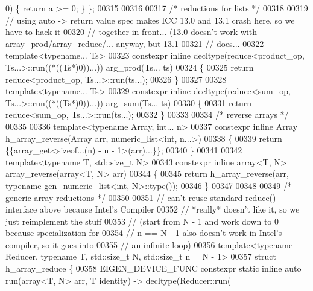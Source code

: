 \begin{DoxyCode}
      0)  \{ \textcolor{keywordflow}{return} a >= 0;  \} \};
00315 
00316 
00317 \textcolor{comment}{/* reductions for lists */}
00318 
00319 \textcolor{comment}{// using auto -> return value spec makes ICC 13.0 and 13.1 crash here, so we have to hack it}
00320 \textcolor{comment}{// together in front... (13.0 doesn't work with array\_prod/array\_reduce/... anyway, but 13.1}
00321 \textcolor{comment}{// does...}
00322 \textcolor{keyword}{template}<\textcolor{keyword}{typename}... Ts>
00323 constexpr \textcolor{keyword}{inline} decltype(reduce<product\_op, Ts...>::run((*((Ts*)0))...)) arg\_prod(Ts... ts)
00324 \{
00325   \textcolor{keywordflow}{return} reduce<product\_op, Ts...>::run(ts...);
00326 \}
00327 
00328 \textcolor{keyword}{template}<\textcolor{keyword}{typename}... Ts>
00329 constexpr \textcolor{keyword}{inline} decltype(reduce<sum\_op, Ts...>::run((*((Ts*)0))...)) arg\_sum(Ts... ts)
00330 \{
00331   \textcolor{keywordflow}{return} reduce<sum\_op, Ts...>::run(ts...);
00332 \}
00333 
00334 \textcolor{comment}{/* reverse arrays */}
00335 
00336 \textcolor{keyword}{template}<\textcolor{keyword}{typename} Array, \textcolor{keywordtype}{int}... n>
00337 constexpr \textcolor{keyword}{inline} Array h\_array\_reverse(Array arr, numeric\_list<int, n...>)
00338 \{
00339   \textcolor{keywordflow}{return} \{\{array\_get<\textcolor{keyword}{sizeof}...(n) - n - 1>(arr)...\}\};
00340 \}
00341 
00342 \textcolor{keyword}{template}<\textcolor{keyword}{typename} T, std::\textcolor{keywordtype}{size\_t} N>
00343 constexpr \textcolor{keyword}{inline} array<T, N> array\_reverse(array<T, N> arr)
00344 \{
00345   \textcolor{keywordflow}{return} h\_array\_reverse(arr, \textcolor{keyword}{typename} gen\_numeric\_list<int, N>::type());
00346 \}
00347 
00348 
00349 \textcolor{comment}{/* generic array reductions */}
00350 
00351 \textcolor{comment}{// can't reuse standard reduce() interface above because Intel's Compiler}
00352 \textcolor{comment}{// *really* doesn't like it, so we just reimplement the stuff}
00353 \textcolor{comment}{// (start from N - 1 and work down to 0 because specialization for}
00354 \textcolor{comment}{// n == N - 1 also doesn't work in Intel's compiler, so it goes into}
00355 \textcolor{comment}{// an infinite loop)}
00356 \textcolor{keyword}{template}<\textcolor{keyword}{typename} Reducer, \textcolor{keyword}{typename} T, std::size\_t N, std::size\_t n = N - 1>
00357 \textcolor{keyword}{struct }h\_array\_reduce \{
00358   EIGEN\_DEVICE\_FUNC constexpr \textcolor{keyword}{static} \textcolor{keyword}{inline} \textcolor{keyword}{auto} run(array<T, N> arr, T identity) -> decltype(Reducer::run(

\end{DoxyCode}
